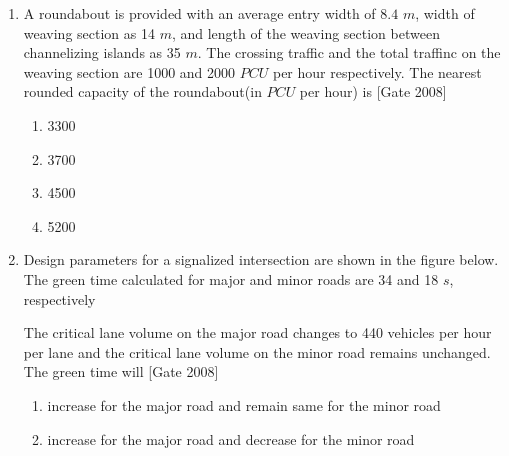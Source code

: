 \documentclass[journal]{IEEEtran}
\begin{document}
\begin{enumerate}
	\item A roundabout is provided with an average entry width of $8.4$ $m$, width of weaving section as 14 $m$, and length of the weaving section between channelizing islands as 35 $m$. The crossing traffic and the total traffinc on the weaving section are 1000 and 2000 $PCU$ per hour respectively. The nearest rounded capacity of the roundabout(in $PCU$ per hour) is  \hfill [Gate 2008]
\begin{multicols}{4}
	\begin{enumerate}
		\item 3300
		\item 3700
		\item 4500
		\item 5200
	\end{enumerate}
\end{multicols}	
	\item Design parameters for a signalized intersection are shown in the figure below. The green time calculated for major and minor roads are 34 and 18 $s$, respectively 
		\begin{figure}[h]
\centering
{}
\end{figure}

		The critical lane volume on the major road changes to 440 vehicles per hour per lane and the critical lane volume on the minor road remains unchanged. The green time will  \hfill [Gate 2008]
\begin{multicols}{2}
	\begin{enumerate}
		\item increase for the major road and remain same for the minor road
		\item increase for the major road and decrease for the minor road


\end{enumerate}
\end{multicols}
\end{enumerate}
\end{document}

